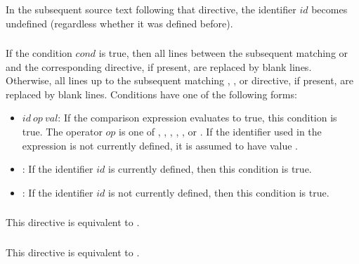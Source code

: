 In the subsequent source text following that directive,
the identifier $\mathit{id}$ becomes undefined
(regardless whether it was defined before).

\subsubsection*{}

If the condition $\mathit{cond}$ is true,
then all lines between the subsequent matching
 or  and the corresponding
 directive, if present,
are replaced by blank lines.
Otherwise, all lines up to the subsequent matching
, , or  directive, if present,
are replaced by blank lines.
%
Conditions have one of the following forms:
\begin{itemize}
\item
$\mathit{id}~\mathit{op}~\mathit{val}$:
If the comparison expression evaluates to true, this condition is true.
The operator $\mathit{op}$ is one of
\code{==}, \code{/=}, \code{<}, \code{<=}, \code{>}, or \code{>=}.
If the identifier used in the expression is not currently defined,
it is assumed to have value .
\item
{}:
If the identifier $\mathit{id}$ is currently defined,
then this condition is true.
\item
{}:
If the identifier $\mathit{id}$ is not currently defined,
then this condition is true.
\end{itemize}


\subsubsection*{}

This directive is equivalent to .

\subsubsection*{}

This directive is equivalent to .

\subsubsection*{}

